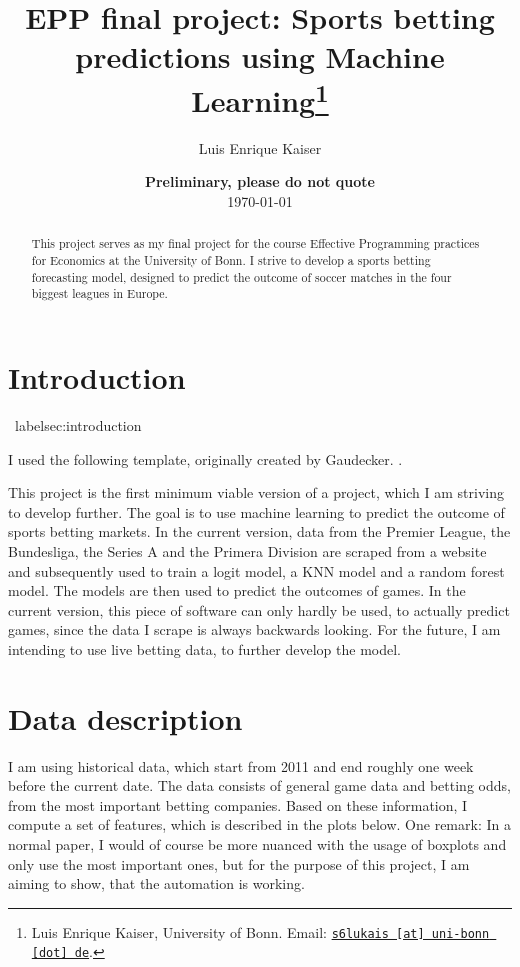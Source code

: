 \documentclass[11pt, a4paper, leqno]{article}
\begin{document}
\title{EPP final project: Sports betting predictions using Machine Learning\thanks{Luis Enrique Kaiser, University of Bonn. Email: \href{mailto:s6lukais@uni-bonn.de}{\nolinkurl{s6lukais [at] uni-bonn [dot] de}}.}}

\author{Luis Enrique Kaiser}

\date{
    {\bf Preliminary, please do not quote}
    \\[1ex]
    \today
}

\maketitle


\begin{abstract}
    This project serves as my final project for the course Effective Programming practices for Economics at the University of Bonn.
    I strive to develop a sports betting forecasting model, designed to predict the outcome of soccer matches in the four biggest
    leagues in Europe.
\end{abstract}

\clearpage


\section{Introduction} %
\ label{sec:introduction}

I used the following template, originally created by Gaudecker. \citet{GaudeckerEconProjectTemplates}.

This project is the first minimum viable version of a project, which I am striving to develop further.
The goal is to use machine learning to predict the outcome of sports betting markets. In the current version,
data from the Premier League, the Bundesliga, the Series A and the Primera Division are scraped from a website and
subsequently used to train a logit model, a KNN model and a random forest model. The models are then used to predict the outcomes of games.
In the current version, this piece of software can only hardly be used, to actually predict games, since the data I scrape is always backwards looking.
For the future, I am intending to use live betting data, to further develop the model.




\section{Data description}
I am using historical data, which start from 2011 and end roughly one week before the current date. The data consists of general game data and betting odds, from the most important
betting companies. Based on these information, I compute a set of features, which is described in the plots below.
One remark: In a normal paper, I would of course be more nuanced with the usage of boxplots and only use the most important ones, but for the purpose of this project, I am aiming to show, that the automation is working.
\end{document}
